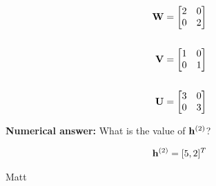 \begin{parts}
    \begin{minipage}{0.6\linewidth}
    \begin{center}
    
    \end{center}
    \end{minipage}
    \begin{minipage}{0.4\linewidth}
    \begin{align*}
        \mathbf{W} &= \begin{bmatrix} 2 & 0 \\ 0 & 2 \end{bmatrix} \\ \\
        \mathbf{V} &= \begin{bmatrix} 1 & 0 \\ 0 & 1 \end{bmatrix} \\ \\
        \mathbf{U} &= \begin{bmatrix} 3 & 0 \\ 0 & 3 \end{bmatrix} 
    \end{align*}
    \end{minipage}

    \begin{subparts}
    \subpart[2] \textbf{Numerical answer:} What is the value of $\mathbf{h}^{(2)}$?
        \begin{tcolorbox}[fit,height=2cm, width=7cm, blank, borderline={1pt}{-2pt}]
        \end{tcolorbox}
        \begin{soln}
            \begin{align*}
                \mathbf{h}^{(2)} &= [5,2]^T \\
            \end{align*}
        \end{soln}
        \begin{qauthor} Matt \end{qauthor}

            

\end{subparts}
\end{parts}
